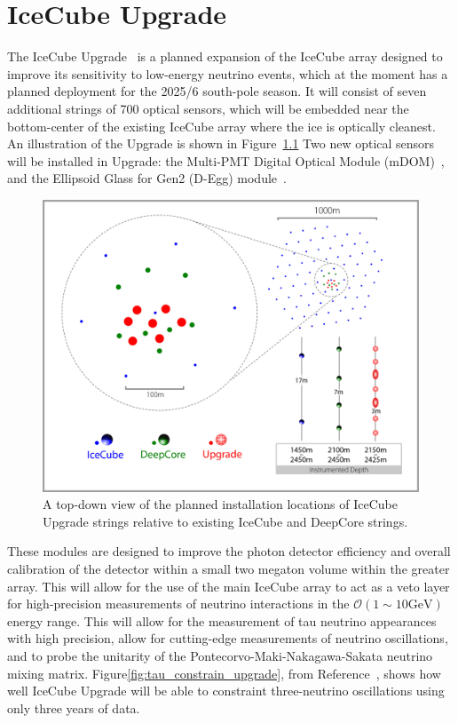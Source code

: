 \documentclass[main.tex]{subfiles}
\begin{document}
\chapter{IceCube Upgrade}\label{chapter:degg}

The IceCube Upgrade~\cite{ishihara2019icecube} is a planned expansion of the IceCube array designed to improve its sensitivity to low-energy neutrino events, which at the moment has a planned deployment for the 2025/6 south-pole season.
It will consist of seven additional strings of 700 optical sensors, which will be embedded near the bottom-center of the existing IceCube array where the ice is optically cleanest. 
An illustration of the Upgrade is shown in Figure~\ref{fig:upgrade_layout}
Two new optical sensors will be installed in Upgrade: the Multi-PMT Digital Optical Module (mDOM)~\cite{classen2019multipmt}, and the Ellipsoid Glass for Gen2 (D-Egg) module~\cite{degg}. 


\begin{figure}
    \centering
    \includegraphics[width=0.7\linewidth]{figures/ICUpgradeLayout_V4b.jpg}
    \caption{A top-down view of the planned installation locations of IceCube Upgrade strings relative to existing IceCube and DeepCore strings.}
    \label{fig:upgrade_layout}
\end{figure}

These modules are designed to improve the photon detector efficiency and overall calibration of the detector within a small two megaton volume within the greater array. 
This will allow for the use of the main IceCube array to act as a veto layer for high-precision measurements of neutrino interactions in the $\mathcal{O}(1\sim 10\text{GeV})$ energy range. 
This will allow for the measurement of tau neutrino appearances with high precision, allow for cutting-edge measurements of neutrino oscillations, and to probe the unitarity of the Pontecorvo-Maki-Nakagawa-Sakata neutrino mixing matrix. 
Figure\ref{fig:tau_constrain_upgrade}, from Reference~\cite{ishihara2019icecube}, shows how well IceCube Upgrade will be able to constraint three-neutrino oscillations using only three years of data. 
\end{document}
